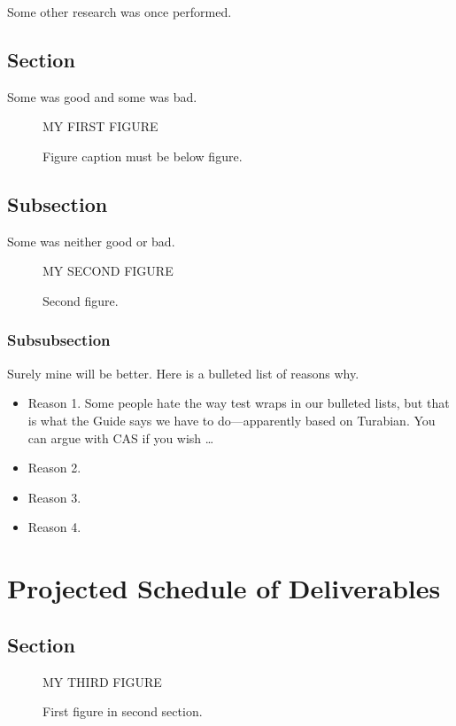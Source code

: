 \documentclass[12pt]{article}
\begin{document}
Some other research was once performed.


\subsection{Section}

Some was good and some was bad.

\begin{figure}
\centering MY FIRST FIGURE
\caption{Figure caption must be below figure.}
\end{figure}


\subsection{Subsection}

Some was neither good or bad.

\begin{figure}
\centering MY SECOND FIGURE
\caption{Second figure.}
\end{figure}


\subsubsection{Subsubsection}

Surely mine will be better.
Here is a bulleted list of reasons why.
\begin{itemize}
\item Reason 1.
Some people hate the way test wraps in our bulleted lists,
but that is what the Guide says we have to do---apparently based on Turabian.
You can argue with CAS if you wish \dots
\item Reason 2.
\item Reason 3.
\item Reason 4.
\end{itemize}


\section{Projected Schedule of Deliverables}


\subsection{Section}


\begin{figure}
\centering MY THIRD FIGURE
\caption{First figure in second section.}
\end{figure}
\end{document}
